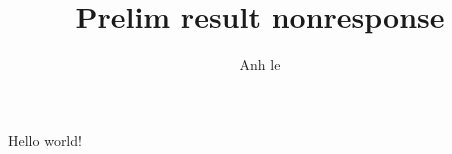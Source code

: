 \documentclass[10pt]{article}
\title{Prelim result nonresponse}
\author{Anh le}
\begin{document}
\maketitle

\begin{abstract}

\end{abstract}

Hello world!

\begin{figure}
    \centerline{
    }
\end{figure}
\end{document}
